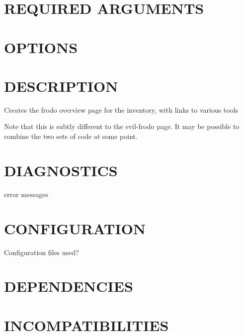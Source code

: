 \documentclass{book}
\begin{document}
\section{REQUIRED ARGUMENTS}
\label{_REQUIRED_ARGUMENTS}
\hypertarget{_REQUIRED_ARGUMENTS}{}


\section{OPTIONS}
\label{_OPTIONS}
\hypertarget{_OPTIONS}{}


\section{DESCRIPTION}
\label{_DESCRIPTION}
\hypertarget{_DESCRIPTION}{}



Creates the frodo overview page for the inventory, with links to various tools



Note that this is subtly different to the evil-frodo page. It may be possible to combine the two sets of code at some point.


\section{DIAGNOSTICS}
\label{_DIAGNOSTICS}
\hypertarget{_DIAGNOSTICS}{}



error messages


\section{CONFIGURATION}
\label{_CONFIGURATION}
\hypertarget{_CONFIGURATION}{}



Configuration files used?


\section{DEPENDENCIES}
\label{_DEPENDENCIES}
\hypertarget{_DEPENDENCIES}{}


\section{INCOMPATIBILITIES}
\label{_INCOMPATIBILITIES}
\hypertarget{_INCOMPATIBILITIES}{}
\end{document}
